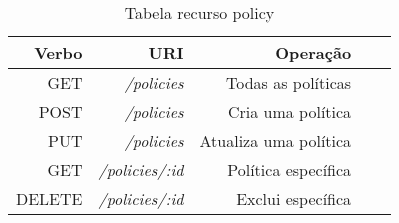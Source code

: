 \begin{table}[!htb]
    \centering
    \caption[resource-optimization]{Tabela recurso policy
    \label{tab:tabela-optimization}}
    \begin{tabular}{rrrrr}
        \toprule
            Verbo & URI & Operação \\ 
        \midrule
            GET & \textit{/policies} & Todas as políticas \\
            POST & \textit{/policies} &  Cria uma política \\
            PUT & \textit{/policies} &  Atualiza uma política \\
            GET & \textit{/policies/:id} & Política específica \\
            DELETE & \textit{/policies/:id} & Exclui específica \\
        \bottomrule
    \end{tabular}
\end{table}


